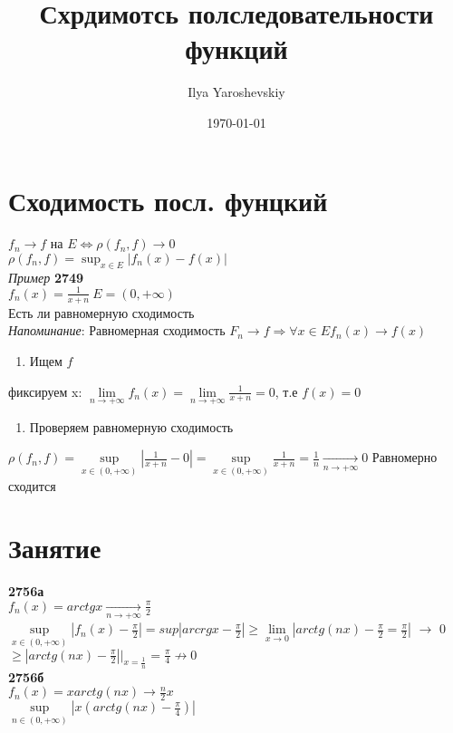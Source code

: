 \documentclass{article}
\author{Ilya Yaroshevskiy}
\date{\today}
\title{Схрдимотсь полследовательности функций}
\begin{document}
\maketitle
\tableofcontents


\section{Сходимость посл. фунцкий}
\label{sec:orgb274afa}
\(f_n \rightarrow f\) на \(E \Leftrightarrow \rho(f_n, f) \rightarrow 0\)  \\
\(\rho(f_n, f) = \sup_{x \in E}|f_n(x) - f(x)|\) \\
\emph{Пример} \textbf{2749} \\
\(f_n(x) = \frac{1}{x + n}\ E=(0, +\infty)\) \\
Есть ли равномерную сходимость \\
\emph{Напоминание}: Равномерная сходимость \(F_n \rightarrow f \Rightarrow \forall x \in E f_n(x) \rightarrow f(x)\)
\begin{enumerate}
\item Ищем \(f\) \\
\end{enumerate}
фиксируем x: \(\lim\limits_{n \to +\infty} f_n(x) = \lim\limits_{n \to +\infty} \frac{1}{x + n} = 0\), т.е \(f(x) = 0\) \\
\begin{enumerate}
\item Проверяем равномерную сходимость \\
\end{enumerate}
\(\rho(f_n, f) = \sup\limits_{x \in (0, +\infty)}\left|\frac{1}{x + n} - 0\right| = \sup\limits_{x\in(0, +\infty)}\frac{1}{x + n} = \frac{1}{n} \xrightarrow[n \to +\infty]{} 0\)
Равномерно сходится

\section{Занятие}
\label{sec:orgf0e461e}
\textbf{2756а} \\
\(f_n(x) = arctg x \xrightarrow[n \to +\infty]{} \frac{\pi}{2}\) \\
\(\sup\limits_{x \in (0, +\infty)} \left|f_n(x) - \frac{\pi}{2}\right| = sup \left| arcrg x - \frac{\pi}{2}\right| \ge \lim\limits_{x \to 0} \left| arctg(nx) - \frac{\pi}{2} = \frac{\pi}{2} \right|\) \textlnot{}\(\to\) 0\\
\(\ge \left| arctg(nx) - \frac{\pi}{2} \right|\Big|_{x = \frac{1}{n}} = \frac{\pi}{4} \not\to 0\) \\
\textbf{2756б} \\
\(f_n(x) = x arctg(nx) \to \frac{n}{2}x\) \\
\(\sup\limits_{n \in (0, +\infty)}\left|x(arctg(nx) - \frac{\pi}{4})\right|\)
\end{document}
